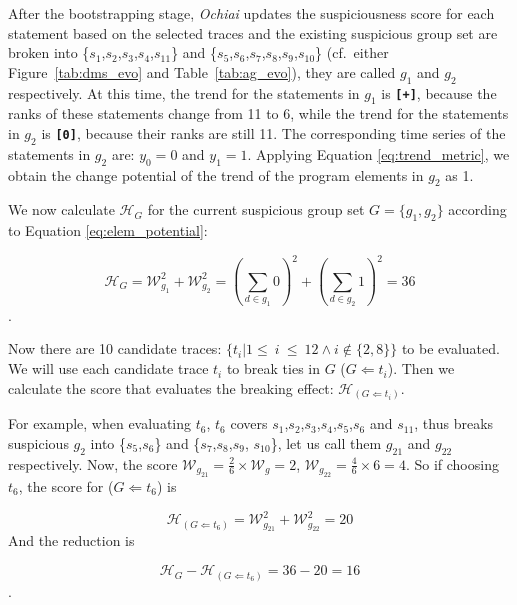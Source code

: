 After the bootstrapping stage, {\em Ochiai} updates the suspiciousness score for each statement based on the selected traces
and the existing suspicious group set are broken into \{$s_{1}$,$s_{2}$,$s_{3}$,$s_{4}$,$s_{11}$\} and \{$s_{5}$,$s_{6}$,$s_{7}$,$s_{8}$,$s_{9}$,$s_{10}$\} (cf.\ either Figure~\ref{tab:dms_evo} and Table~\ref{tab:ag_evo}), they are
called $g_{1}$ and $g_{2}$ respectively.
At this time, the trend for the statements in $g_{1}$ is {\bf\texttt{[+]}}, because the ranks of these statements change from 11 to 6, while the trend for the statements in $g_{2}$
is {\bf\texttt{[0]}}, because their ranks are still 11.
The corresponding time series of the statements in $g_{2}$ are:
$y_{0} = 0$ and $ y_{1} = 1$. Applying Equation \ref{eq:trend_metric}, we obtain the change potential of the trend of the program elements in $g_{2}$ as 1.


We now calculate $\mathcal{H}_{G}$ for the current suspicious group set $G=\{g_{1},g_{2}\}$ according to Equation \ref{eq:elem_potential}:

\[\mathcal{H}_{G} = \mathcal{W}_{g_{1}}^{2} + \mathcal{W}_{g_{2}}^{2}  = (\sum_{d \in g_{1}}{0})^{2} + (\sum_{d \in g_{2}}{1})^{2} = 36\].

Now there are 10 candidate traces: $\{t_{i} | 1\leq~i~\leq~12 \wedge i\notin\{2,8\}\}$ to be evaluated. We will use each candidate trace $t_{i}$ to
break ties in $G$ ($G \Leftarrow t_{i}$). Then we calculate the score that evaluates the breaking effect: $\mathcal{H}_{(G \Leftarrow t_{i})}$.

For example, when evaluating $t_6$, $t_{6}$ covers $s_{1}$,$s_{2}$,$s_{3}$,$s_{4}$,$s_{5}$,$s_{6}$ and $s_{11}$, thus breaks suspicious $g_{2}$
into \{$s_{5}$,$s_{6}$\} and \{$s_{7}$,$s_{8}$,$s_{9}$, $s_{10}$\}, let us call them $g_{21}$ and $g_{22}$ respectively.
Now, the score $\mathcal{W}_{g_{21}} = \frac{2}{6} \times \mathcal{W}_{g} = 2$, $\mathcal{W}_{g_{22}} = \frac{4}{6} \times 6 = 4$.
So if choosing $t_{6}$, the score for ($G\Leftarrow t_6$) is

\[\mathcal{H}_{(G \Leftarrow t_{6})} = \mathcal{W}_{g_{21}}^{2} + \mathcal{W}_{g_{22}}^{2} = 20\]
And the reduction is

\[\mathcal{H}_{G} - \mathcal{H}_{(G \Leftarrow t_{6})} = 36 - 20 = 16\].

